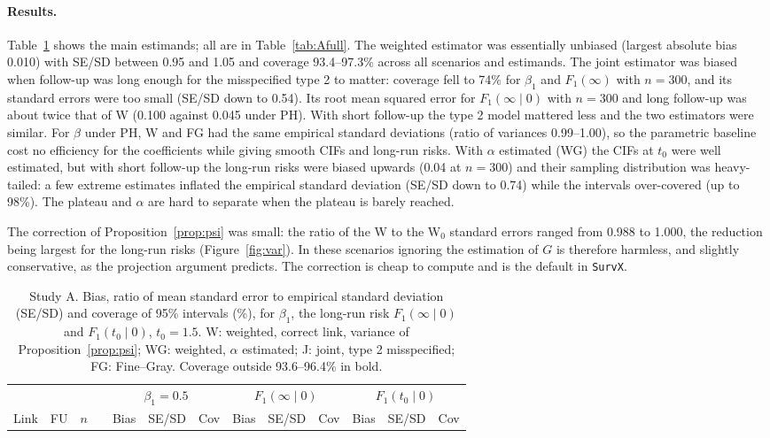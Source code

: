 \documentclass[11pt]{article}
\begin{document}
\paragraph{Results.} Table~\ref{tab:A} shows the main estimands; all are in
Table~\ref{tab:Afull}. The weighted estimator was essentially unbiased (largest absolute bias 0.010)
with SE/SD between 0.95 and 1.05 and coverage 93.4--97.3\% across all scenarios and estimands.
The joint estimator was biased when follow-up was long enough for the misspecified type 2 to matter:
coverage fell to 74\% for $\beta_1$ and $F_1(\infty)$ with $n = 300$, and its standard errors
were too small (SE/SD down to 0.54). Its root mean squared error for $F_1(\infty \mid 0)$ with
$n = 300$ and long follow-up was about twice that of W (0.100 against 0.045 under PH). With short
follow-up the type 2 model mattered less and the two estimators were similar. For $\beta$ under PH,
W and FG had the same empirical standard deviations (ratio of variances 0.99--1.00), so the
parametric baseline cost no efficiency for the coefficients while giving smooth CIFs and long-run
risks. With $\alpha$ estimated (WG) the CIFs at $t_0$ were well estimated, but with short follow-up
the long-run risks were biased upwards (0.04 at $n = 300$) and their sampling distribution was
heavy-tailed: a few extreme estimates inflated the empirical standard deviation (SE/SD down to
0.74) while the intervals over-covered (up to 98\%). The plateau and $\alpha$ are hard to separate
when the plateau is barely reached.

The correction of Proposition~\ref{prop:psi} was small: the ratio of the W to the W$_0$ standard
errors ranged from 0.988 to 1.000, the reduction being largest for the long-run risks
(Figure~\ref{fig:var}). In these scenarios ignoring the estimation of $G$ is therefore harmless,
and slightly conservative, as the projection argument predicts. The correction is cheap to
compute and is the default in \texttt{SurvX}.

\begin{table}[tbp]
\centering\scriptsize
\caption{Study A. Bias, ratio of mean standard error to empirical standard deviation (SE/SD) and
coverage of 95\% intervals (\%), for $\beta_1$, the long-run risk $F_1(\infty \mid 0)$ and
$F_1(t_0 \mid 0)$, $t_0 = 1.5$. W: weighted, correct link, variance of Proposition~\ref{prop:psi};
WG: weighted, $\alpha$ estimated; J: joint, type 2 misspecified; FG: Fine--Gray. Coverage outside
93.6--96.4\% in bold.}
\label{tab:A}
\setlength{\tabcolsep}{3.5pt}
\begin{tabular}{llll rrr rrr rrr}
\toprule
 & & & & \multicolumn{3}{c}{$\beta_1 = 0.5$} & \multicolumn{3}{c}{$F_1(\infty \mid 0)$} & \multicolumn{3}{c}{$F_1(t_0 \mid 0)$}\\
\cmidrule(lr){5-7}\cmidrule(lr){8-10}\cmidrule(lr){11-13}
Link & FU & $n$ & & Bias & SE/SD & Cov & Bias & SE/SD & Cov & Bias & SE/SD & Cov \\
\midrule

\end{tabular}
\end{table}
\end{document}
